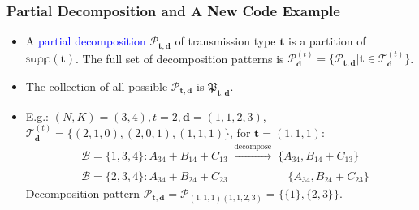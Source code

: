 \documentclass{beamer}
\begin{document}
\begin{frame}
\frametitle{Partial Decomposition and A New Code Example}
\begin{itemize}
	\item A \textcolor{blue}{partial decomposition} $\mathcal{P}_{\boldsymbol{t},\boldsymbol{d}}$ of transmission type $\boldsymbol{t}$ is a partition of $\mathbb{supp}(\boldsymbol{t})$. The full set of decomposition patterns is $\boldsymbol{\mathcal{P}}_{\boldsymbol{d}}^{(t)}= \{\mathcal{P}_{\boldsymbol{t},\boldsymbol{d}} | \boldsymbol{t} \in \mathcal{T}_{\boldsymbol{d}}^{(t)}\}$.
	\item The collection of all possible $\mathcal{P}_{\boldsymbol{t},\boldsymbol{d}}$ is $\mathfrak{P}_{\boldsymbol{t},\boldsymbol{d}}$.
	\item E.g.: $(N,K)=(3,4), t=2,\boldsymbol{d}=(1,1,2,3)$,
	$\mathcal{T}_{\boldsymbol{d}}^{(t)}= \{(2,1,0), (2,0,1),(1,1,1)\}$, for $\boldsymbol{t}=(1,1,1)$:
\vspace{-10pt}
\begin{align*}
& \mathcal{B}=\{1,3,4\}: A_{34}+B_{14}+C_{13}  \;  \xrightarrow[]{\text{decompose}} \; \{A_{34}, B_{14}+C_{13} \}\\
&  \mathcal{B}=\{2,3,4\}: A_{34}+B_{24}+C_{23}  \; \quad \qquad  \qquad \{A_{34}, B_{24}+C_{23}\}
\end{align*}
Decomposition pattern $\mathcal{P}_{\boldsymbol{t},\boldsymbol{d}}=\mathcal{P}_{(1,1,1)(1,1,2,3)}=\{\{1\}, \{2,3\}\}$.
\end{itemize}
\end{frame}
\end{document}
